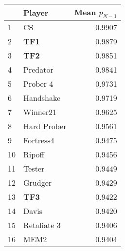 \begin{tabular}{llr}
\toprule
{} &       Player &  Mean $p_{N-1}$ \\
\midrule
1  &           CS &          0.9907 \\
2  &          \textbf{TF1} &          0.9879 \\
3  &          \textbf{TF2} &          0.9851 \\
4  &     Predator &          0.9841 \\
5  &     Prober 4 &          0.9731 \\
6  &    Handshake &          0.9719 \\
7  &     Winner21 &          0.9625 \\
8  &  Hard Prober &          0.9561 \\
9  &    Fortress4 &          0.9475 \\
10 &       Ripoff &          0.9456 \\
11 &       Tester &          0.9449 \\
12 &      Grudger &          0.9429 \\
13 &          \textbf{TF3} &          0.9422 \\
14 &        Davis &          0.9420 \\
15 &  Retaliate 3 &          0.9406 \\
16 &         MEM2 &          0.9404 \\
\bottomrule
\end{tabular}
